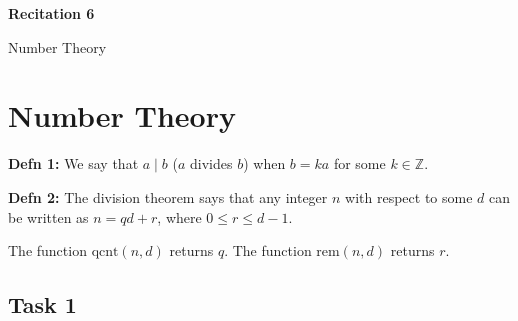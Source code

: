 \documentclass[12pt,letterpaper]{article}
\newcommand\Z{\mathbb Z}
\begin{document}
  \thispagestyle{firstpagestyle}
  \begin{center}
    {\large \textbf{Recitation 6}}
    
    {\large Number Theory}
  \end{center}
  
  
   \section*{Number Theory}	
	
	\textbf{Defn 1:} We say that $a \mid b$ ($a$ divides $b$) when $b = ka$ for some $k \in \Z$. 
	
	\textbf{Defn 2:} The division theorem says that any integer $n$ with respect to some $d$ can be written as $n = qd + r$, where $0 \leq r \leq d-1$.
	
	The function $\text{qcnt}(n,d)$ 
	returns $q$. The function 
    $\text{rem}(n, d)$
	returns $r$.
 
	\subsection*{Task 1}
\end{document}
